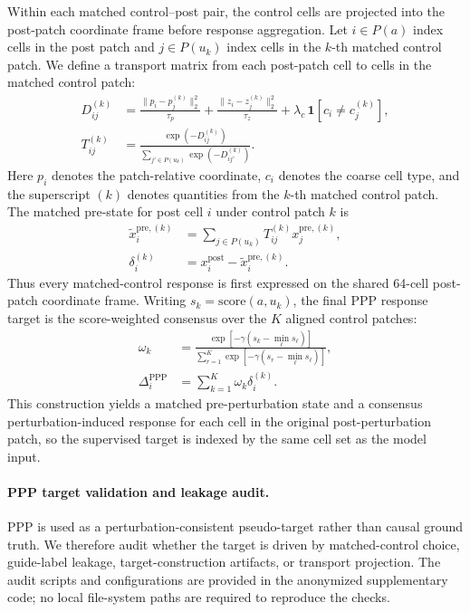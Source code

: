 \documentclass[sigconf,review,balance=false]{acmart}
\begin{document}
Within each matched control--post pair, the control cells are projected into the post-patch coordinate frame before response aggregation. Let $i\in P(a)$ index cells in the post patch and $j\in P(u_k)$ index cells in the $k$-th matched control patch. We define a transport matrix from each post-patch cell to cells in the matched control patch:
\[
\begin{aligned}
D_{ij}^{(k)}
&=
\frac{\|p_i-p_j^{(k)}\|_2^2}{\tau_p}
+
\frac{\|z_i-z_j^{(k)}\|_2^2}{\tau_z}
+
\lambda_c\,\mathbf{1}[c_i\neq c_j^{(k)}],\\
T_{ij}^{(k)}
&=
\frac{\exp(-D_{ij}^{(k)})}
{\sum_{j'\in P(u_k)}\exp(-D_{ij'}^{(k)})}.
\end{aligned}
\]
Here $p_i$ denotes the patch-relative coordinate, $c_i$ denotes the coarse cell type, and the superscript $(k)$ denotes quantities from the $k$-th matched control patch. The matched pre-state for post cell $i$ under control patch $k$ is
\[
\begin{aligned}
\widetilde{x}^{\mathrm{pre},(k)}_i
&=
\sum_{j\in P(u_k)}T^{(k)}_{ij}x^{\mathrm{pre},(k)}_j,\\
\delta_i^{(k)}
&=
x_i^{\mathrm{post}}-\widetilde{x}^{\mathrm{pre},(k)}_i .
\end{aligned}
\]
Thus every matched-control response is first expressed on the shared 64-cell post-patch coordinate frame. Writing $s_k=\mathrm{score}(a,u_k)$, the final PPP response target is the score-weighted consensus over the $K$ aligned control patches:
\[
\begin{aligned}
\omega_k
&=
\frac{
\exp[-\gamma(s_k-\min_{\ell}s_\ell)]
}{
\sum_{r=1}^{K}\exp[-\gamma(s_r-\min_{\ell}s_\ell)]
},\\
\Delta_i^{\mathrm{PPP}}
&=
\sum_{k=1}^{K}\omega_k\delta_i^{(k)} .
\end{aligned}
\]
This construction yields a matched pre-perturbation state and a consensus perturbation-induced response for each cell in the original post-perturbation patch, so the supervised target is indexed by the same cell set as the model input.

\paragraph{PPP target validation and leakage audit.}
PPP is used as a perturbation-consistent pseudo-target rather than causal ground truth. We therefore audit whether the target is driven by matched-control choice, guide-label leakage, target-construction artifacts, or transport projection. The audit scripts and configurations are provided in the anonymized supplementary code; no local file-system paths are required to reproduce the checks.
\end{document}
